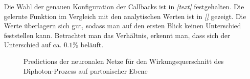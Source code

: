 Die Wahl der genauen Konfiguration der Callbacks ist in \textit{\autoref{text}} festgehalten.
Die gelernte Funktion im Vergleich mit den analytischen Werten ist in \textit{\autoref{}} gezeigt. Die Werte überlagern sich gut, sodass man auf den ersten Blick keinen Unterschied feststellen kann. Betrachtet man das Verhältnis, erkennt man, dass sich der Unterschied auf ca. $0.1\%$ beläuft. 
\begin{figure}[hbt]
	\centering
	\caption{Predictions der neuronalen Netze für den Wirkungsquerschnitt des Diphoton-Prozess auf partonischer Ebene}
	\label{partonic_eta_model}
\end{figure}

